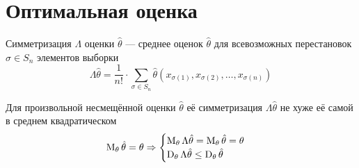 \section{Оптимальная оценка}
\begin{definition}[Симметризация]
  Симметризация $\Lambda$ оценки $\hat{\theta}$ --- среднее
  оценок $\hat{\theta}$ для
  всевозможных перестановок $\sigma\in S_n$
  элементов выборки \xsample
  $$\Lambda\hat{\theta}
      = \frac{1}{n!}\cdot\sum_{\sigma\in S_n} \hat{\theta}\left(
      x_{\sigma\left(1\right)}, x_{\sigma\left(2\right)},
          \dots, x_{\sigma\left(n\right)}\right)$$
\end{definition}
\begin{lemma}
  Для произвольной несмещённой оценки $\hat{\theta}$
  её симметризация $\Lambda{\hat{\theta}}$
  не хуже её самой в среднем квадратическом
  \begin{align*}
  \operatorname{M}_{\theta} \hat{\theta}
      = \theta
  \Rightarrow
      \begin{cases}
      \operatorname{M}_{\theta} \Lambda{\hat{\theta}}
          = \operatorname{M}_{\theta} \hat{\theta}
          = \theta\\
      \operatorname{D}_{\theta} \Lambda{\hat{\theta}}
          \le\operatorname{D}_{\theta} \hat{\theta}
      \end{cases}
  \end{align*}
\end{lemma}
